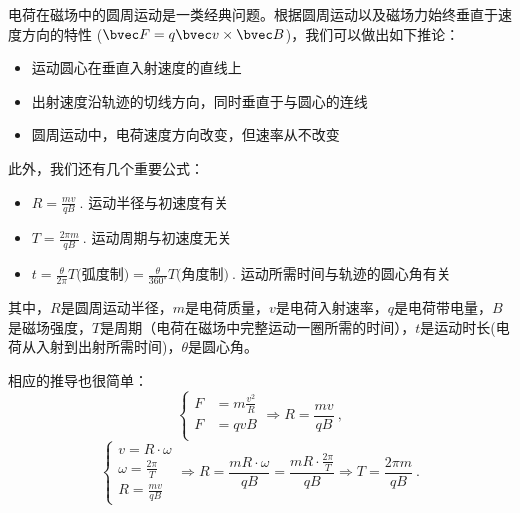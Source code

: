 
电荷在磁场中的圆周运动是一类经典问题。根据圆周运动以及磁场力始终垂直于速度方向的特性 ($\bvec F = q\bvec v \times \bvec B$)，我们可以做出如下推论：
\begin{itemize}
\item 运动圆心在垂直入射速度的直线上
\item 出射速度沿轨迹的切线方向，同时垂直于与圆心的连线
\item 圆周运动中，电荷速度方向改变，但速率从不改变
\end{itemize}

此外，我们还有几个重要公式：
\begin{itemize}
\item $R=\frac{mv}{qB}~.$ 运动半径与初速度有关
\item $T=\frac{2\pi m}{qB}~.$ 运动周期与初速度无关
\item $t = \frac{\theta}{2\pi} T\text{(弧度制)}= \frac{\theta}{360^\circ } T\text{(角度制)}~.$ 运动所需时间与轨迹的圆心角有关
\end{itemize}
其中，$R$是圆周运动半径，$m$是电荷质量，$v$是电荷入射速率，$q$是电荷带电量，$B$是磁场强度，$T$是周期（电荷在磁场中完整运动一圈所需的时间），$t$是运动时长(电荷从入射到出射所需时间)，$\theta$是圆心角。

相应的推导也很简单：
$$
\left \{
\begin{aligned}
F&=m\frac{v^2}{R}\\
F&=qvB\\
\end{aligned}
\Rightarrow
R=\frac{mv}{qB}
\right.
~,
$$
$$
\left \{
\begin{aligned}
v=R\cdot\omega\\
\omega = \frac{2\pi}{T}\\
R=\frac{mv}{qB}
\end{aligned}
\Rightarrow
R=\frac{mR\cdot\omega}{qB}=\frac{mR\cdot\frac{2\pi}{T}}{qB}
\Rightarrow
T=\frac{2\pi m}{qB}
\right.
~.
$$
